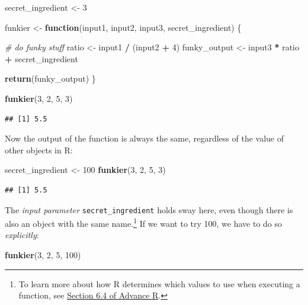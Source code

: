 \documentclass[
]{book}
\newenvironment{Shaded}{\begin{snugshade}}{\end{snugshade}}
\newcommand{\CommentTok}[1]{\textcolor[rgb]{0.56,0.35,0.01}{\textit{#1}}}
\newcommand{\ControlFlowTok}[1]{\textcolor[rgb]{0.13,0.29,0.53}{\textbf{#1}}}
\newcommand{\DecValTok}[1]{\textcolor[rgb]{0.00,0.00,0.81}{#1}}
\newcommand{\FunctionTok}[1]{\textcolor[rgb]{0.13,0.29,0.53}{\textbf{#1}}}
\newcommand{\NormalTok}[1]{#1}
\newcommand{\OtherTok}[1]{\textcolor[rgb]{0.56,0.35,0.01}{#1}}
\newcommand{\SpecialCharTok}[1]{\textcolor[rgb]{0.81,0.36,0.00}{\textbf{#1}}}
\begin{document}
\begin{Shaded}
\begin{Highlighting}[]
\NormalTok{secret\_ingredient }\OtherTok{\textless{}{-}} \DecValTok{3}

\NormalTok{funkier }\OtherTok{\textless{}{-}} \ControlFlowTok{function}\NormalTok{(input1, input2, input3, secret\_ingredient) \{}
  
  \CommentTok{\# do funky stuff}
\NormalTok{  ratio }\OtherTok{\textless{}{-}}\NormalTok{ input1 }\SpecialCharTok{/}\NormalTok{ (input2 }\SpecialCharTok{+} \DecValTok{4}\NormalTok{)}
\NormalTok{  funky\_output }\OtherTok{\textless{}{-}}\NormalTok{ input3 }\SpecialCharTok{*}\NormalTok{ ratio }\SpecialCharTok{+}\NormalTok{ secret\_ingredient}
  
  \FunctionTok{return}\NormalTok{(funky\_output)  }
\NormalTok{\}}

\FunctionTok{funkier}\NormalTok{(}\DecValTok{3}\NormalTok{, }\DecValTok{2}\NormalTok{, }\DecValTok{5}\NormalTok{, }\DecValTok{3}\NormalTok{)}
\end{Highlighting}
\end{Shaded}

\begin{verbatim}
## [1] 5.5
\end{verbatim}

Now the output of the function is always the same, regardless of the value of other objects in R:

\begin{Shaded}
\begin{Highlighting}[]
\NormalTok{secret\_ingredient }\OtherTok{\textless{}{-}} \DecValTok{100}
\FunctionTok{funkier}\NormalTok{(}\DecValTok{3}\NormalTok{, }\DecValTok{2}\NormalTok{, }\DecValTok{5}\NormalTok{, }\DecValTok{3}\NormalTok{)}
\end{Highlighting}
\end{Shaded}

\begin{verbatim}
## [1] 5.5
\end{verbatim}

The \emph{input parameter} \texttt{secret\_ingredient} holds sway here, even though there is also an object with the same name.\footnote{To learn more about how R determines which values to use when executing a function, see \href{https://adv-r.hadley.nz/functions.html\#lexical-scoping}{Section 6.4 of Advance R}.} If we want to try 100, we have to do so \emph{explicitly}:

\begin{Shaded}
\begin{Highlighting}[]
\FunctionTok{funkier}\NormalTok{(}\DecValTok{3}\NormalTok{, }\DecValTok{2}\NormalTok{, }\DecValTok{5}\NormalTok{, }\DecValTok{100}\NormalTok{)}
\end{Highlighting}
\end{Shaded}
\end{document}
